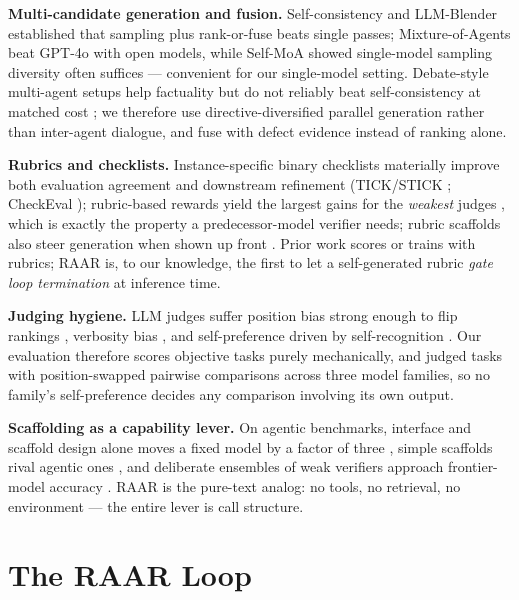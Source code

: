 \documentclass[journal]{IEEEtran}
\newcommand{\method}{RAAR}
\begin{document}
\textbf{Multi-candidate generation and fusion.} Self-consistency
\cite{wang2022} and LLM-Blender \cite{jiang2023} established that sampling
plus rank-or-fuse beats single passes; Mixture-of-Agents \cite{wang2024moa}
beat GPT-4o with open models, while Self-MoA \cite{selfmoa2025} showed
single-model sampling diversity often suffices --- convenient for our
single-model setting. Debate-style multi-agent setups help factuality
\cite{du2023} but do not reliably beat self-consistency at matched cost
\cite{smit2024}; we therefore use directive-diversified parallel generation
rather than inter-agent dialogue, and fuse with defect evidence instead of
ranking alone.

\textbf{Rubrics and checklists.} Instance-specific binary checklists
materially improve both evaluation agreement and downstream refinement
(TICK/STICK \cite{tick2024}; CheckEval \cite{checkeval2024}); rubric-based
rewards yield the largest gains for the \emph{weakest} judges
\cite{rar2025}, which is exactly the property a predecessor-model verifier
needs; rubric scaffolds also steer generation when shown up front
\cite{ruscarl2025}. Prior work scores or trains with rubrics; \method{} is,
to our knowledge, the first to let a self-generated rubric \emph{gate loop
termination} at inference time.

\textbf{Judging hygiene.} LLM judges suffer position bias strong enough to
flip rankings \cite{wangfair2023}, verbosity bias \cite{zheng2023}, and
self-preference driven by self-recognition \cite{panickssery2024,
wataoka2024}. Our evaluation therefore scores objective tasks purely
mechanically, and judged tasks with position-swapped pairwise comparisons
across three model families, so no family's self-preference decides any
comparison involving its own output.

\textbf{Scaffolding as a capability lever.} On agentic benchmarks,
interface and scaffold design alone moves a fixed model by a factor of
three \cite{yang2024sweagent}, simple scaffolds rival agentic ones
\cite{xia2024agentless}, and deliberate ensembles of weak verifiers
approach frontier-model accuracy \cite{saadfalcon2025}.
\method{} is the pure-text analog: no tools, no retrieval, no environment
--- the entire lever is call structure.

\section{The \method{} Loop}
\label{sec:method}
\end{document}
